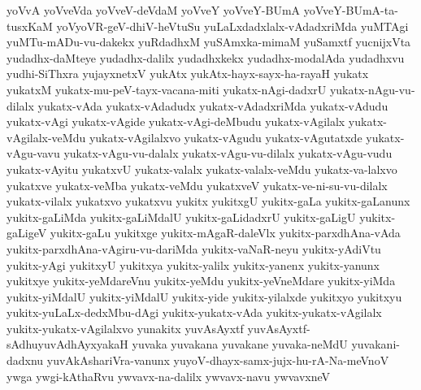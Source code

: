 {yoVvA
yoVveVda
yoVveV-deVdaM
yoVveY
yoVveY-BUmA
yoVveY-BUmA-ta-tusxKaM
yoVyoVR-geV-dhiV-heVtuSu
yuLaLxdadxlalx-vAdadxriMda
yuMTAgi
yuMTu-mADu-vu-dakekx
yuRdadhxM
yuSAmxka-mimaM
yuSamxtf
yucnijxVta
yudadhx-daMteye
yudadhx-dalilx
yudadhxkekx
yudadhx-modalAda
yudadhxvu
yudhi-SiThxra
yujayxnetxV
yukAtx
yukAtx-hayx-sayx-ha-rayaH
yukatx
yukatxM
yukatx-mu-peV-tayx-vacana-miti
yukatx-nAgi-dadxrU
yukatx-nAgu-vu-dilalx
yukatx-vAda
yukatx-vAdadudx
yukatx-vAdadxriMda
yukatx-vAdudu
yukatx-vAgi
yukatx-vAgide
yukatx-vAgi-deMbudu
yukatx-vAgilalx
yukatx-vAgilalx-veMdu
yukatx-vAgilalxvo
yukatx-vAgudu
yukatx-vAgutatxde
yukatx-vAgu-vavu
yukatx-vAgu-vu-dalalx
yukatx-vAgu-vu-dilalx
yukatx-vAgu-vudu
yukatx-vAyitu
yukatxvU
yukatx-valalx
yukatx-valalx-veMdu
yukatx-va-lalxvo
yukatxve
yukatx-veMba
yukatx-veMdu
yukatxveV
yukatx-ve-ni-su-vu-dilalx
yukatx-vilalx
yukatxvo
yukatxvu
yukitx
yukitxgU
yukitx-gaLa
yukitx-gaLanunx
yukitx-gaLiMda
yukitx-gaLiMdalU
yukitx-gaLidadxrU
yukitx-gaLigU
yukitx-gaLigeV
yukitx-gaLu
yukitxge
yukitx-mAgaR-daleVlx
yukitx-parxdhAna-vAda
yukitx-parxdhAna-vAgiru-vu-dariMda
yukitx-vaNaR-neyu
yukitx-yAdiVtu
yukitx-yAgi
yukitxyU
yukitxya
yukitx-yalilx
yukitx-yanenx
yukitx-yanunx
yukitxye
yukitx-yeMdareVnu
yukitx-yeMdu
yukitx-yeVneMdare
yukitx-yiMda
yukitx-yiMdalU
yukitx-yiMdalU
yukitx-yide
yukitx-yilalxde
yukitxyo
yukitxyu
yukitx-yuLaLx-dedxMbu-dAgi
yukitx-yukatx-vAda
yukitx-yukatx-vAgilalx
yukitx-yukatx-vAgilalxvo
yunakitx
yuvAsAyxtf
yuvAsAyxtf-sAdhuyuvAdhAyxyakaH
yuvaka
yuvakana
yuvakane
yuvaka-neMdU
yuvakani-dadxnu
yuvAkAshariVra-vanunx
yuyoV-dhayx-samx-jujx-hu-rA-Na-meVnoV
ywga
ywgi-kAthaRvu
ywvavx-na-dalilx
ywvavx-navu
ywvavxneV
}
